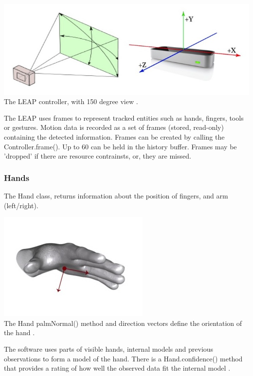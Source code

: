 \documentclass[a4paper, 10pt]{article}
\begin{document}
\begin{center}
\includegraphics[scale=0.4]{leap}\\
The LEAP controller, with 150 degree view \cite{leap}.
\end{center}

The LEAP uses frames to represent tracked entities such as hands, fingers, tools or gestures. Motion data is recorded as a set of frames (stored, read-only) containing the detected information. Frames can be created by calling the Controller.frame(). Up to 60 can be held in the history buffer. Frames may be 'dropped' if there are resource contrainsts, or, they are missed.

\subsubsection{Hands}
The Hand class, returns information about the position of fingers, and arm (left/right).

\begin{center}
\includegraphics[scale=0.4]{palm}\\
The Hand palmNormal() method and direction vectors define the orientation of the hand \cite{leap}.
\end{center}

The software uses parts of visible hands, internal models and previous observations to form a model of the hand. There is a Hand.confidence() method that provides a rating of how well the observed data fit the internal model \cite{leap}.
\end{document}
